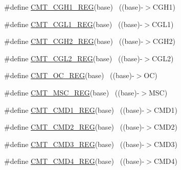 \begin{DoxyCompactItemize}
\item 
\#define \hyperlink{group___c_m_t___register___accessor___macros_ga1f00c7e08c77c8d2388cc2f0f819d187}{C\+M\+T\+\_\+\+C\+G\+H1\+\_\+\+R\+EG}(base)                                          ~((base)-\/$>$C\+G\+H1)
\item 
\#define \hyperlink{group___c_m_t___register___accessor___macros_ga771dd48290399c3c4f3b104299e28f66}{C\+M\+T\+\_\+\+C\+G\+L1\+\_\+\+R\+EG}(base)                                          ~((base)-\/$>$C\+G\+L1)
\item 
\#define \hyperlink{group___c_m_t___register___accessor___macros_ga8aeb87a39cf6d86e317a6ddb8340e8fa}{C\+M\+T\+\_\+\+C\+G\+H2\+\_\+\+R\+EG}(base)                                          ~((base)-\/$>$C\+G\+H2)
\item 
\#define \hyperlink{group___c_m_t___register___accessor___macros_gac1baf38413e70d4e3077963d08d67c1a}{C\+M\+T\+\_\+\+C\+G\+L2\+\_\+\+R\+EG}(base)                                          ~((base)-\/$>$C\+G\+L2)
\item 
\#define \hyperlink{group___c_m_t___register___accessor___macros_ga2b29abafd53b2d21c63ac04ca73c8ab3}{C\+M\+T\+\_\+\+O\+C\+\_\+\+R\+EG}(base)                                              ~((base)-\/$>$OC)
\item 
\#define \hyperlink{group___c_m_t___register___accessor___macros_ga8b8f43bd61d3d9b918c86cc17e530a23}{C\+M\+T\+\_\+\+M\+S\+C\+\_\+\+R\+EG}(base)                                            ~((base)-\/$>$M\+SC)
\item 
\#define \hyperlink{group___c_m_t___register___accessor___macros_gaf70e5f0b96785634416451b252de9522}{C\+M\+T\+\_\+\+C\+M\+D1\+\_\+\+R\+EG}(base)                                          ~((base)-\/$>$C\+M\+D1)
\item 
\#define \hyperlink{group___c_m_t___register___accessor___macros_ga52cac578885360a51fb5f8333a32499f}{C\+M\+T\+\_\+\+C\+M\+D2\+\_\+\+R\+EG}(base)                                          ~((base)-\/$>$C\+M\+D2)
\item 
\#define \hyperlink{group___c_m_t___register___accessor___macros_gae48de2fa2e70ed138d31e8369dfa5a3a}{C\+M\+T\+\_\+\+C\+M\+D3\+\_\+\+R\+EG}(base)                                          ~((base)-\/$>$C\+M\+D3)
\item 
\#define \hyperlink{group___c_m_t___register___accessor___macros_ga3d423ab9fbac444983cf6a0dc2071d38}{C\+M\+T\+\_\+\+C\+M\+D4\+\_\+\+R\+EG}(base)                                          ~((base)-\/$>$C\+M\+D4)
\item 

\end{DoxyCompactItemize}
